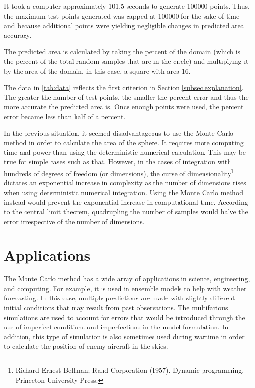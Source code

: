 \documentclass[10pt, letterpaper]{article}
\begin{document}
  It took a computer approximately 101.5 seconds to generate 100000 points. Thus, the maximum test points generated was
  capped at 100000 for the sake of time and because additional points were yielding negligible changes in predicted area accuracy.

  The predicted area is calculated by taking the percent of the domain (which is the percent of the total random samples that are in the circle)
  and multiplying it by the area of the domain, in this case, a square with area 16.

  The data in \ref{tab:data} reflects the first criterion in Section \ref{subsec:explanation}. The greater the number of test points,
  the smaller the percent error and thus the more accurate the predicted area is. Once enough points were used, the percent error became
  less than half of a percent.

  In the previous situation, it seemed disadvantageous to use the Monte Carlo method in order to calculate the area of the sphere. It requires
  more computing time and power than using the deterministic numerical calculation. This may be true for simple cases such as that. However,
  in the cases of integration with hundreds of degrees of freedom (or dimensions), the curse of dimensionality\footnote{Richard Ernest Bellman;
  Rand Corporation (1957). Dynamic programming. Princeton University Press.} dictates an exponential increase in complexity as the number of
  dimensions rises when using deterministic numerical integration. Using the Monte Carlo method instead would prevent the exponential increase
  in computational time. According to the central limit theorem, quadrupling the number of samples would halve the error irrespective of the
  number of dimensions.

  \section{Applications}

  The Monte Carlo method has a wide array of applications in science, engineering, and computing. For example, it is used in ensemble models to
  help with weather forecasting. In this case, multiple predictions are made with slightly different initial conditions that may result from
  past observations. The multifarious simulations are used to account for errors that would be introduced through the use of imperfect conditions
  and imperfections in the model formulation. In addition, this type of simulation is also sometimes used during wartime in order to calculate
  the position of enemy aircraft in the skies.
\end{document}
